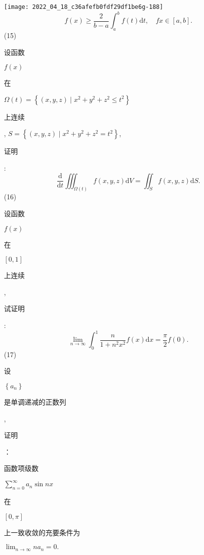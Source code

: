 \documentclass[10pt]{article}
\begin{document}
\texttt{[image: 2022\_04\_18\_c36afefb0fdf29df1be6g-188]}
$$
f(x) \geq \frac{2}{b-a} \int_{a}^{b} f(t) \mathrm{d} t, \quad f x \in[a, b] .
$$
(15) \begin{CJK}{UTF8}{mj}设函数\end{CJK} $f(x)$ \begin{CJK}{UTF8}{mj}在\end{CJK} $\Omega(t)=\left\{(x, y, z) \mid x^{2}+y^{2}+z^{2} \leq t^{2}\right\}$ \begin{CJK}{UTF8}{mj}上连续\end{CJK}, $S=\left\{(x, y, z) \mid x^{2}+y^{2}+z^{2}=t^{2}\right\}$, \begin{CJK}{UTF8}{mj}证明\end{CJK}:
$$
\frac{\mathrm{d}}{\mathrm{d} t} \iiint_{\Omega(t)} f(x, y, z) \mathrm{d} V=\iint_{S} f(x, y, z) \mathrm{d} S .
$$
(16) \begin{CJK}{UTF8}{mj}设函数\end{CJK} $f(x)$ \begin{CJK}{UTF8}{mj}在\end{CJK} $[0,1]$ \begin{CJK}{UTF8}{mj}上连续\end{CJK}, \begin{CJK}{UTF8}{mj}试证明\end{CJK}:
$$
\lim _{n \rightarrow \infty} \int_{0}^{1} \frac{n}{1+n^{2} x^{2}} f(x) \mathrm{d} x=\frac{\pi}{2} f(0) .
$$
(17) \begin{CJK}{UTF8}{mj}设\end{CJK} $\left\{a_{n}\right\}$ \begin{CJK}{UTF8}{mj}是单调递减的正数列\end{CJK}, \begin{CJK}{UTF8}{mj}证明\end{CJK}：\begin{CJK}{UTF8}{mj}函数项级数\end{CJK} $\sum_{n=0}^{\infty} a_{n} \sin n x$ \begin{CJK}{UTF8}{mj}在\end{CJK} $[0, \pi]$ \begin{CJK}{UTF8}{mj}上一致收敛的充要条件为\end{CJK} $\lim _{n \rightarrow \infty} n a_{n}=0 .$
\end{document}

